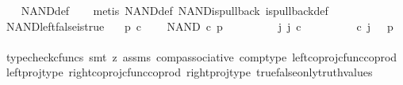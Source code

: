 \begin{isabellebody}
%
\isadelimproof
\ \ %
\endisadelimproof
%
\isatagproof
{}\isamarkupfalse%
\ NAND{\isacharunderscore}{\kern0pt}def\isanewline
\ \ \isamarkupfalse%
\ {\isacharparenleft}{\kern0pt}metis\ NAND{\isacharunderscore}{\kern0pt}def\ NAND{\isacharunderscore}{\kern0pt}is{\isacharunderscore}{\kern0pt}pullback\ is{\isacharunderscore}{\kern0pt}pullback{\isacharunderscore}{\kern0pt}def{\isacharparenright}{\kern0pt}%
\endisatagproof
{\isafoldproof}%
%
\isadelimproof
\ \isanewline
%
\endisadelimproof
\isanewline
{}\isamarkupfalse%
\ NAND{\isacharunderscore}{\kern0pt}left{\isacharunderscore}{\kern0pt}false{\isacharunderscore}{\kern0pt}is{\isacharunderscore}{\kern0pt}true{\isacharcolon}{\kern0pt}\isanewline
\ \ \ {\isachardoublequoteopen}p\ {\isasymin}\isactrlsub c\ {\isasymOmega}{\isachardoublequoteclose}\isanewline
\ \ \ {\isachardoublequoteopen}NAND\ {\isasymcirc}\isactrlsub c\ {\isasymlangle}{\isasymf}{\isacharcomma}{\kern0pt}p{\isasymrangle}\ {\isacharequal}{\kern0pt}\ {\isasymt}{\isachardoublequoteclose}\isanewline
%
\isadelimproof
%
\endisadelimproof
%
\isatagproof
{}\isamarkupfalse%
\ {\isacharminus}{\kern0pt}\ \isanewline
\ \ \isamarkupfalse%
\ {\isachardoublequoteopen}{\isasymexists}\ j{\isachardot}{\kern0pt}\ j\ {\isasymin}\isactrlsub c\ {\isasymone}{\isasymCoprod}{\isacharparenleft}{\kern0pt}{\isasymone}{\isasymCoprod}{\isasymone}{\isacharparenright}{\kern0pt}\ {\isasymand}\ {\isacharparenleft}{\kern0pt}{\isasymlangle}{\isasymf}{\isacharcomma}{\kern0pt}\ {\isasymf}{\isasymrangle}\ {\isasymamalg}\ {\isacharparenleft}{\kern0pt}{\isasymlangle}{\isasymt}{\isacharcomma}{\kern0pt}\ {\isasymf}{\isasymrangle}\ {\isasymamalg}{\isasymlangle}{\isasymf}{\isacharcomma}{\kern0pt}\ {\isasymt}{\isasymrangle}{\isacharparenright}{\kern0pt}{\isacharparenright}{\kern0pt}\ {\isasymcirc}\isactrlsub c\ j\ \ {\isacharequal}{\kern0pt}\ {\isasymlangle}{\isasymf}{\isacharcomma}{\kern0pt}p{\isasymrangle}{\isachardoublequoteclose}\isanewline
\ \ \ \ \isamarkupfalse%
\ {\isacharparenleft}{\kern0pt}typecheck{\isacharunderscore}{\kern0pt}cfuncs{\isacharcomma}{\kern0pt}\ smt\ {\isacharparenleft}{\kern0pt}z{}{\isacharparenright}{\kern0pt}\ assms\ comp{\isacharunderscore}{\kern0pt}associative{}\ comp{\isacharunderscore}{\kern0pt}type\ left{\isacharunderscore}{\kern0pt}coproj{\isacharunderscore}{\kern0pt}cfunc{\isacharunderscore}{\kern0pt}coprod\ left{\isacharunderscore}{\kern0pt}proj{\isacharunderscore}{\kern0pt}type\ right{\isacharunderscore}{\kern0pt}coproj{\isacharunderscore}{\kern0pt}cfunc{\isacharunderscore}{\kern0pt}coprod\ right{\isacharunderscore}{\kern0pt}proj{\isacharunderscore}{\kern0pt}type\ true{\isacharunderscore}{\kern0pt}false{\isacharunderscore}{\kern0pt}only{\isacharunderscore}{\kern0pt}truth{\isacharunderscore}{\kern0pt}values{\isacharparenright}{\kern0pt}\isanewline

\end{isabellebody}
